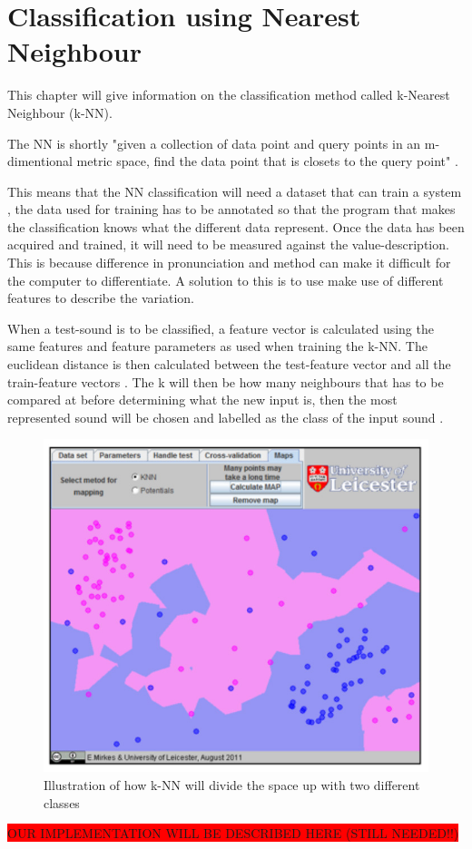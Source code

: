 \section{Classification using Nearest Neighbour}
This chapter will give information on the classification method called k-Nearest Neighbour (k-NN).

The NN is shortly "given a collection of data point and query points in an m-dimentional metric space, find the data point that is closets to the query point"
\citep{meaningfulNN}.

This means that the NN classification will need a dataset that can train a system \citep{Sinyor05}, the data used for training has to be annotated so that the program that makes the classification knows what the different data represent. 
Once the data has been acquired and trained, it will need to be measured against the value-description. This is because difference in pronunciation and method can make it difficult for the computer to differentiate. A solution to this is to use make use of different features to describe the variation.

When a test-sound is to be classified, a feature vector is calculated using the same features and feature parameters as used when training the k-NN.
The euclidean distance is then calculated between the test-feature vector and all the train-feature vectors \citep{NNHD}.
The k will then be how many neighbours that has to be compared at before determining what the new input is, then the most represented sound will be chosen and labelled as the class of the input sound \citep{introKNN}.

\begin{figure}[h]
	\begin{center}
		\includegraphics[scale = 0.5]{fig/KNNfig.jpg}
		\caption{Illustration of how k-NN will divide the space up with two different classes \citep{introKNN}}
		\label{KNN fig}
	\end{center}
\end{figure}

\colorbox{red}{OUR IMPLEMENTATION WILL BE DESCRIBED HERE (STILL NEEDED!!)}